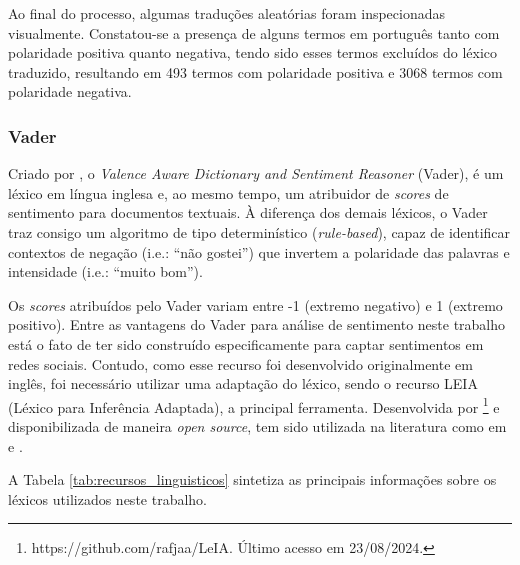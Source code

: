 Ao final do processo, algumas traduções aleatórias foram inspecionadas visualmente. Constatou-se a presença de alguns termos em português tanto com polaridade positiva quanto negativa, tendo sido esses termos excluídos do léxico traduzido, resultando em 493 termos com polaridade positiva e 3068 termos com polaridade negativa. 


\subsubsection{Vader}

Criado por \textcite{hutto_vader_2014}, o \textit{Valence Aware Dictionary and Sentiment Reasoner} (Vader), é um léxico em língua inglesa e, ao mesmo tempo, um atribuidor de \textit{scores} de sentimento para documentos textuais. À diferença dos demais léxicos, o Vader traz consigo um algoritmo de tipo determinístico (\textit{rule-based}), capaz de identificar contextos de negação (i.e.: \enquote{não gostei}) que invertem a polaridade das palavras e intensidade (i.e.: \enquote{muito bom}).

Os \textit{scores} atribuídos pelo Vader variam entre -1 (extremo negativo) e 1 (extremo positivo). Entre as vantagens do Vader para análise de sentimento neste trabalho está o fato de ter sido construído especificamente para captar sentimentos em redes sociais. Contudo, como esse recurso foi desenvolvido originalmente em inglês, foi necessário utilizar uma adaptação do léxico, sendo o recurso LEIA (Léxico para Inferência Adaptada), a principal ferramenta. Desenvolvida por \textcite{almeida_leia_2018}\footnote{https://github.com/rafjaa/LeIA. Último acesso em 23/08/2024.} e disponibilizada de maneira \textit{open source}, tem sido utilizada na literatura como em \textcite{marques_sentiment_2022} e \textcite{barreiro_implementacao_2023}. 

A Tabela \ref{tab:recursos_linguisticos} sintetiza as principais informações sobre os léxicos utilizados neste trabalho. 

